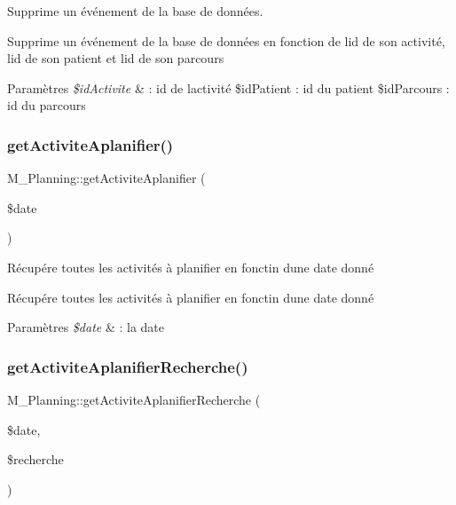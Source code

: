 Supprime un événement de la base de données. 

Supprime un événement de la base de données en fonction de l\textquotesingle{}id de son activité, l\textquotesingle{}id de son patient et l\textquotesingle{}id de son parcours 
\begin{DoxyParams}{Paramètres}
{\em \$id\+Activite} & \+: id de l\textquotesingle{}activité \$id\+Patient \+: id du patient \$id\+Parcours \+: id du parcours \\
\hline
\end{DoxyParams}
\mbox{\label{class_m___planning_ac8e09307ac103e0f2b8bbfa828e7f723}} 
\subsubsection{\texorpdfstring{get\+Activite\+Aplanifier()}{getActiviteAplanifier()}}
{\footnotesize\ttfamily M\+\_\+\+Planning\+::get\+Activite\+Aplanifier (\begin{DoxyParamCaption}\item[{}]{\$date }\end{DoxyParamCaption})}



Récupére toutes les activités à planifier en fonctin d\textquotesingle{}une date donné 

Récupére toutes les activités à planifier en fonctin d\textquotesingle{}une date donné 
\begin{DoxyParams}{Paramètres}
{\em \$date} & \+: la date \\
\hline
\end{DoxyParams}
\mbox{\label{class_m___planning_aaa5c4efca4bf8509b7e8eae4076ba246}} 
\subsubsection{\texorpdfstring{get\+Activite\+Aplanifier\+Recherche()}{getActiviteAplanifierRecherche()}}
{\footnotesize\ttfamily M\+\_\+\+Planning\+::get\+Activite\+Aplanifier\+Recherche (\begin{DoxyParamCaption}\item[{}]{\$date,  }\item[{}]{\$recherche }\end{DoxyParamCaption})}



